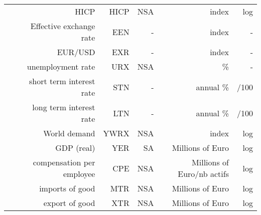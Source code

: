 \documentclass[11pt,a4paper]{article}
\begin{document}
\begin{table}[htbp]
{\begin{tabular}{rrrrrr}
    \multicolumn{1}{c}{} &
      HICP &
      HICP &
      NSA &
      index &
      log
      \\
    \multicolumn{1}{c}{} &
      Effective exchange rate &
      EEN &
      - &
      index &
      -
      \\
    \multicolumn{1}{c}{} &
      EUR/USD &
      EXR &
      - &
      index &
      -
      \\
    \multicolumn{1}{c}{} &
      unemployment rate &
      URX &
      NSA &
      \% &
      -
      \\
    \multicolumn{1}{c}{} &
      short term interest rate &
      STN &
      - &
      annual \% &
      /100
      \\
    \multicolumn{1}{c}{} &
      long term interest rate &
      LTN &
      - &
      annual \% &
      /100
      \\
    \multicolumn{1}{c}{} &
      World demand &
      YWRX &
      NSA &
      index &
      log
      \\
    \multicolumn{1}{c}{} &
      GDP (real) &
      YER &
      SA &
      Millions of Euro &
      log
      \\
    \multicolumn{1}{c}{} &
      compensation per employee &
      CPE &
      NSA &
      Millions of Euro/nb actifs &
      log
      \\
    \multicolumn{1}{c}{} &
      imports of good &
      MTR &
      NSA &
      Millions of Euro &
      log
      \\
    \multicolumn{1}{c}{} &
      export of good &
      XTR &
      NSA &
      Millions of Euro &
      log
      \\
    \bottomrule
    \end{tabular}

  \label{tab:addlabel}
}
\end{table}
\end{document}
